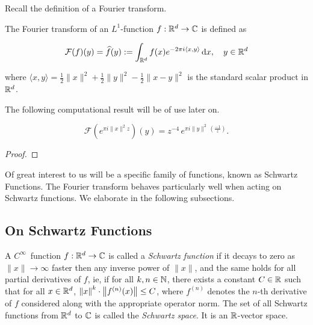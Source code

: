 Recall the definition of a Fourier transform.

\begin{definition}\label{def:Fourier-Transform}\leanok
  The Fourier transform of an $L^1$-function $f:\mathbb{R}^d\to\mathbb{C}$ is defined as

  \[
    \mathcal{F}(f)(y) = \widehat{f}(y) := \int_{\mathbb{R}^d} f(x)e^{-2\pi i \langle x, y \rangle} \,\mathrm{d}x, \quad y \in \mathbb{R}^d
  \]

  where $\langle x, y \rangle = \frac12\|x\|^2 + \frac12\|y\|^2 - \frac12\|x - y\|^2$ is the standard scalar product in $\mathbb{R}^d$.
\end{definition}

The following computational result will be of use later on.

\begin{lemma}\label{lemma:Gaussian-Fourier}
  \begin{equation}
    \mathcal{F}(e^{\pi i \|x\|^2 z})(y) = z^{-4}\,e^{\pi i \|y\|^2 \,(\frac{-1}{z}) }.
  \end{equation}
\end{lemma}
\begin{proof}
\end{proof}

Of great interest to us will be a specific family of functions, known as Schwartz Functions. The Fourier transform behaves particularly well when acting on Schwartz functions. We elaborate in the following subsections.

\subsection{On Schwartz Functions}

\begin{definition}\label{def:Schwartz-Space}\leanok
A $C^\infty$~function $f:\mathbb{R}^d\to\mathbb{C}$ is called a \emph{Schwartz function} if it decays to zero as $\|x\|\to\infty$ faster then any inverse power of $\|x\|$, and the same holds for all partial derivatives of $f$, ie, if for all $k, n \in \mathbb{N}$, there exists a constant $C \in \mathbb{R}$ such that for all $x \in \mathbb{R}^d$, $\left\lVert x \right\rVert^k \cdot \left\lVert f^{(n)}(x) \right\rVert \leq C$, where $f^{(n)}$ denotes the $n$-th derivative of $f$ considered along with the appropriate operator norm. The set of all Schwartz functions from $\mathbb{R}^d$ to $\mathbb{C}$ is called the \emph{Schwartz space}. It is an $\mathbb{R}$-vector space.
\end{definition}

